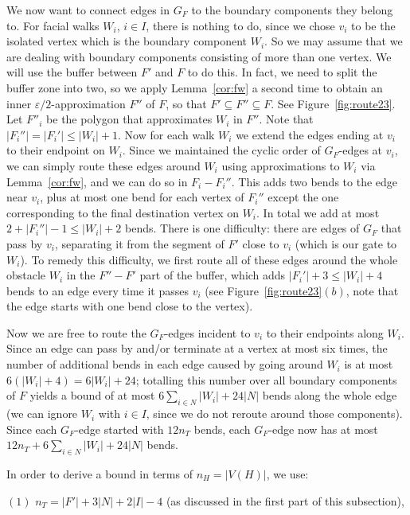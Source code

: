 \documentclass{llncs}
\begin{document}
We now want to connect edges in $G_F$ to the boundary components they belong to. For facial walks $W_i$, $i \in I$, there is nothing to do, since we chose $v_i$ to be the isolated vertex which is the boundary component $W_i$. So we may assume that we are dealing with boundary components consisting of more than one vertex. We will use the buffer between $F'$ and $F$ to do this. In fact, we need to split the buffer zone into two,  so we apply
Lemma~\ref{cor:fw} a second time to obtain an inner $\varepsilon/2$-approximation $F''$ of $F$, so that $F' \subseteq F'' \subseteq F$. See Figure~\ref{fig:route23}. Let $F''_i$ be the polygon that approximates $W_i$ in $F''$. Note that $|F_i''| = |F_i'| \le |W_i| + 1$.
Now for each walk $W_i$ we extend the edges ending at $v_i$ to their endpoint on $W_i$. Since we maintained the cyclic order of $G_F$-edges at $v_i$, we can simply route these edges around $W_i$ using approximations to $W_i$ via Lemma~\ref{cor:fw}, and we can do so in $F_i-F_i''$.
This adds two bends to the edge near $v_i$, plus at most one bend for each vertex of $F_i''$ except the one corresponding to the final destination vertex on $W_i$.  In total we add at most $2 + |F_i''|-1 \le |W_i| + 2$ bends.
There is one difficulty: there are edges of $G_F$ that pass by $v_i$, separating it from the segment of $F'$ close to $v_i$ (which is our gate to $W_i$). To remedy this difficulty, we first route all of these edges around the whole obstacle $W_i$ in the $F''-F'$ part of the buffer, which adds $|F_i'| + 3 \le |W_i| + 4$ bends to an edge every time it passes $v_i$ (see Figure~\ref{fig:route23}$(b)$, note that the edge starts with one bend close to the vertex).



Now we are free to route the $G_F$-edges incident to $v_i$ to their endpoints along $W_i$. Since an edge can pass by and/or terminate at a vertex at most six times, the number of additional bends in each edge caused by going around
$W_i$ is at most $6(|W_i| + 4) = 6|W_i| + 24$; totalling this number over all boundary components of $F$ yields a bound of at most
$6 \sum_{i\in N} |W_i| + 24|N|$ bends along the whole edge (we can ignore $W_i$ with $i \in I$, since we do not reroute around those components). Since each $G_F$-edge started with $12n_T$ bends, each $G_F$-edge now has at most
$12n_T + 6\sum_{i\in N} |W_i| + 24|N|$ bends.
 



In order to derive a bound in terms of $n_H=|V(H)|$, we use:

$(1)$ $n_T = |F'| + 3|N| + 2|I| -4$  (as discussed in the first part of this subsection),
\end{document}
